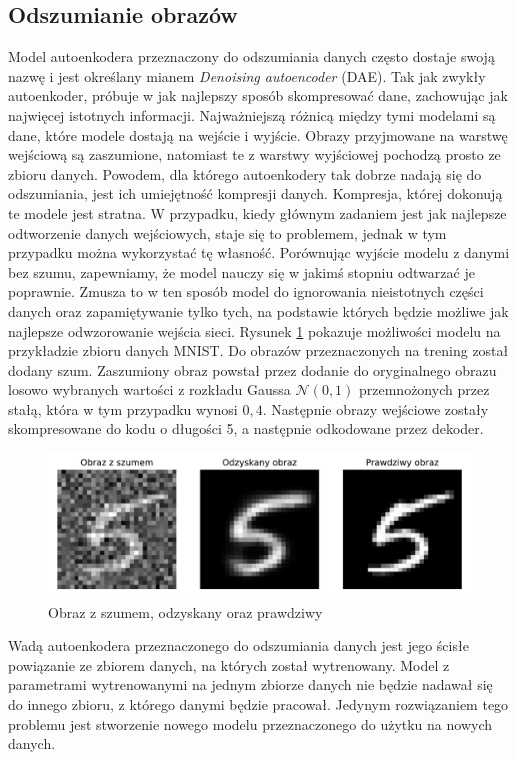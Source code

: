 \documentclass[a4paper,12pt,oneside]{book} %
\begin{document}
\subsection{Odszumianie obrazów}
Model autoenkodera przeznaczony do odszumiania danych często dostaje swoją nazwę i jest określany mianem \textit{Denoising autoencoder} (DAE). Tak jak zwykły autoenkoder, próbuje w jak najlepszy sposób skompresować dane, zachowując jak najwięcej istotnych informacji. Najważniejszą różnicą między tymi modelami są dane, które modele dostają na wejście i wyjście. Obrazy przyjmowane na warstwę wejściową są zaszumione, natomiast te z warstwy wyjściowej pochodzą prosto ze zbioru danych.
Powodem, dla którego autoenkodery tak dobrze nadają się do odszumiania, jest ich umiejętność kompresji danych. Kompresja, której dokonują te modele jest stratna. W przypadku, kiedy głównym zadaniem jest jak najlepsze odtworzenie danych wejściowych, staje się to problemem, jednak w tym przypadku można wykorzystać tę własność. Porównując wyjście modelu z danymi bez szumu, zapewniamy, że model nauczy się w jakimś stopniu odtwarzać je poprawnie. Zmusza to w ten sposób model do ignorowania nieistotnych części danych oraz zapamiętywanie tylko tych, na podstawie których będzie możliwe jak najlepsze odwzorowanie wejścia sieci.
Rysunek \ref{fig:noisedae} pokazuje możliwości modelu na przykładzie zbioru danych MNIST. Do obrazów przeznaczonych na trening został dodany szum. Zaszumiony obraz powstał przez dodanie do oryginalnego obrazu losowo wybranych wartości z rozkładu Gaussa $\mathcal{N}(0,1)$ przemnożonych przez stałą, która w tym przypadku wynosi $0,4$. Następnie obrazy wejściowe zostały skompresowane do kodu o długości 5, a następnie odkodowane przez dekoder. 
\begin{figure}[h!]
	\centering\includegraphics[width=14.5cm]{denoisingae.pdf}
	\caption{Obraz z szumem, odzyskany oraz prawdziwy}
	\label{fig:noisedae}
\end{figure}

Wadą autoenkodera przeznaczonego do odszumiania danych jest jego ścisłe powiązanie ze zbiorem danych, na których został wytrenowany. Model z parametrami wytrenowanymi na jednym zbiorze danych nie będzie nadawał się do innego zbioru, z którego danymi będzie pracował. Jedynym rozwiązaniem tego problemu jest stworzenie nowego modelu przeznaczonego do użytku na nowych danych. 
\end{document}
